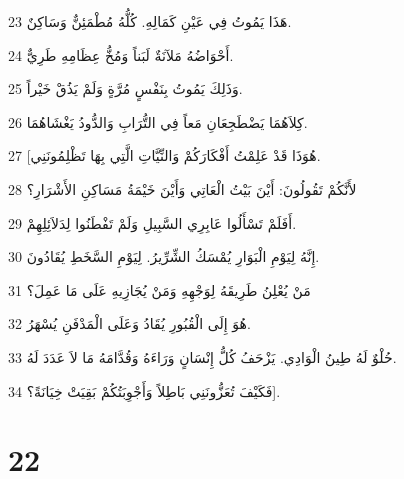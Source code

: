 \par 23 هَذَا يَمُوتُ فِي عَيْنِ كَمَالِهِ. كُلُّهُ مُطْمَئِنٌّ وَسَاكِنٌ.
\par 24 أَحْوَاضُهُ مَلآنَةٌ لَبَناً وَمُخُّ عِظَامِهِ طَرِيٌّ.
\par 25 وَذَلِكَ يَمُوتُ بِنَفْسٍ مُرَّةٍ وَلَمْ يَذُقْ خَيْراً.
\par 26 كِلاَهُمَا يَضْطَجِعَانِ مَعاً فِي التُّرَابِ وَالدُّودُ يَغْشَاهُمَا.
\par 27 [هُوَذَا قَدْ عَلِمْتُ أَفْكَارَكُمْ وَالنِّيَّاتِ الَّتِي بِهَا تَظْلِمُونَنِي.
\par 28 لأَنَّكُمْ تَقُولُونَ: أَيْنَ بَيْتُ الْعَاتِي وَأَيْنَ خَيْمَةُ مَسَاكِنِ الأَشْرَارِ؟
\par 29 أَفَلَمْ تَسْأَلُوا عَابِرِي السَّبِيلِ وَلَمْ تَفْطَنُوا لِدَلاَئِلِهِمْ.
\par 30 إِنَّهُ لِيَوْمِ الْبَوَارِ يُمْسَكُ الشِّرِّيرُ. لِيَوْمِ السَّخَطِ يُقَادُونَ.
\par 31 مَنْ يُعْلِنُ طَرِيقَهُ لِوَجْهِهِ وَمَنْ يُجَازِيهِ عَلَى مَا عَمِلَ؟
\par 32 هُوَ إِلَى الْقُبُورِ يُقَادُ وَعَلَى الْمَدْفَنِ يُسْهَرُ.
\par 33 حُلْوٌ لَهُ طِينُ الْوَادِي. يَزْحَفُ كُلُّ إِنْسَانٍ وَرَاءَهُ وَقُدَّامَهُ مَا لاَ عَدَدَ لَهُ.
\par 34 فَكَيْفَ تُعَزُّونَنِي بَاطِلاً وَأَجْوِبَتُكُمْ بَقِيَتْ خِيَانَةً؟].

\chapter{22}

